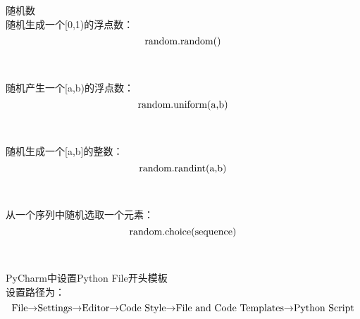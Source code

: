 \documentclass{book}%
\begin{document}
{\heiti 随机数}\\
随机生成一个[0,1)的浮点数：\\
$$\makebox{random.random()}$$\\
~\\
随机产生一个[a,b)的浮点数：\\
$$\makebox{random.uniform(a,b)}$$\\
~\\
随机生成一个[a,b]的整数：\\
$$\makebox{random.randint(a,b)}$$\\
~\\
从一个序列中随机选取一个元素：\\
$$\makebox{random.choice(sequence)}$$\\
~\\

{\heiti PyCharm中设置Python File开头模板}\\
设置路径为：\\
$$\makebox{File$\rightarrow$Settings$\rightarrow$Editor$\rightarrow$Code Style$\rightarrow$File and Code Templates$\rightarrow$Python Script}$$\\
~\\
\end{document}
